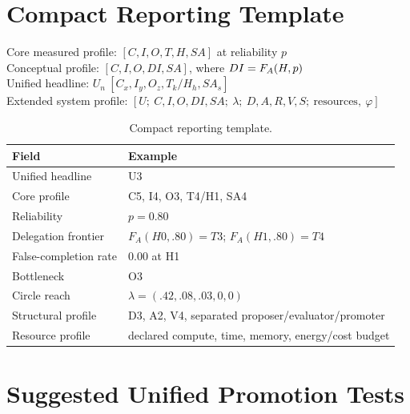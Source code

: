 \section{Compact Reporting Template}

\begin{center}
Core measured profile: $[C, I, O, T, H, SA]$ at reliability $p$\\
Conceptual profile: $[C, I, O, DI, SA]$, where $DI = F_A(H,p){}$\\
Unified headline: $U_n\ [C_x, I_y, O_z, T_k/H_h, SA_s]$\\
Extended system profile: $[U;\ C,I,O,DI,SA;\ \lambda;\ D,A,R,V,S;\ \text{resources},\ \varphi]$
\end{center}

\begin{table}[!htbp]
\centering\small
\begin{tabularx}{\textwidth}{@{}lY@{}}
\toprule
Field & Example \\
\midrule
Unified headline & U3 \\
Core profile & C5, I4, O3, T4/H1, SA4 \\
Reliability & $p = 0.80$ \\
Delegation frontier & $F_A(H0,.80)=T3$; $F_A(H1,.80)=T4$ \\
False-completion rate \emph{} & 0.00 at H1 \\
Bottleneck & O3 \\
Circle reach & $\lambda = (.42,.08,.03,0,0)$ \\
Structural profile & D3, A2, V4, separated proposer/evaluator/promoter \\
Resource profile & declared compute, time, memory, energy/cost budget \\
\bottomrule
\end{tabularx}
\caption{Compact reporting template.}
\label{tab:template}
\end{table}

\section{Suggested Unified Promotion Tests}

